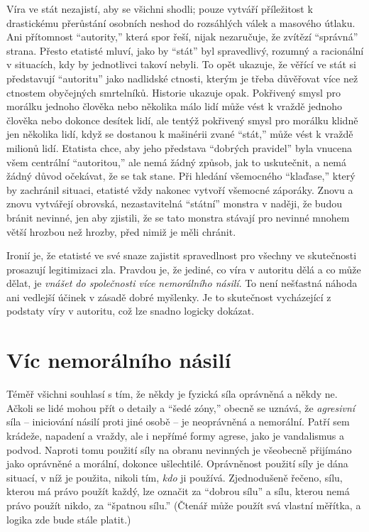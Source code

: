\documentclass{book}
\begin{document}
Víra ve stát nezajistí, aby se všichni shodli; pouze vytváří příležitost k drastickému přerůstání osobních neshod do rozsáhlých válek a masového útlaku. Ani přítomnost \enquote{autority,} která spor řeší, nijak nezaručuje, že zvítězí \enquote{správná} strana. Přesto etatisté mluví, jako by \enquote{stát} byl spravedlivý, rozumný a racionální v situacích, kdy by jednotlivci takoví nebyli. To opět ukazuje, že věřící ve stát si představují \enquote{autoritu} jako nadlidské ctnosti, kterým je třeba důvěřovat více než ctnostem obyčejných smrtelníků. Historie ukazuje opak. Pokřivený smysl pro morálku jednoho člověka nebo několika málo lidí může vést k vraždě jednoho člověka nebo dokonce desítek lidí, ale tentýž pokřivený smysl pro morálku klidně jen několika lidí, když se dostanou k mašinérii zvané \enquote{stát,} může vést k vraždě milionů lidí. Etatista chce, aby jeho představa \enquote{dobrých pravidel} byla vnucena všem centrální \enquote{autoritou,} ale nemá žádný způsob, jak to uskutečnit, a nemá žádný důvod očekávat, že se tak stane. Při hledání všemocného \enquote{klaďase,} který by zachránil situaci, etatisté vždy nakonec vytvoří všemocné záporáky. Znovu a znovu vytvářejí obrovská, nezastavitelná \enquote{státní} monstra v naději, že budou bránit nevinné, jen aby zjistili, že se tato monstra stávají pro nevinné mnohem větší hrozbou než hrozby, před nimiž je měli chránit.

Ironií je, že etatisté ve své snaze zajistit spravedlnost pro všechny ve skutečnosti prosazují legitimizaci zla. Pravdou je, že jediné, co víra v autoritu dělá a co může dělat, je \emph{vnášet do společnosti více nemorálního násilí}. To není nešťastná náhoda ani vedlejší účinek v zásadě dobré myšlenky. Je to skutečnost vycházející z podstaty víry v autoritu, což lze snadno logicky dokázat.

\section{Víc nemorálního násilí}

Téměř všichni souhlasí s tím, že někdy je fyzická síla oprávněná a někdy ne. Ačkoli se lidé mohou přít o detaily a \enquote{šedé zóny,} obecně se uznává, že \emph{agresivní} síla -- iniciování násilí proti jiné osobě -- je neoprávněná a nemorální. Patří sem krádeže, napadení a vraždy, ale i nepřímé formy agrese, jako je vandalismus a podvod. Naproti tomu použití síly na obranu nevinných je všeobecně přijímáno jako oprávněné a morální, dokonce ušlechtilé. Oprávněnost použití síly je dána situací, v níž je použita, nikoli tím, \emph{kdo} ji používá. Zjednodušeně řečeno, sílu, kterou má právo použít každý, lze označit za \enquote{dobrou sílu} a sílu, kterou nemá právo použít nikdo, za \enquote{špatnou sílu.} (Čtenář může použít svá vlastní měřítka, a logika zde bude stále platit.)
\end{document}
